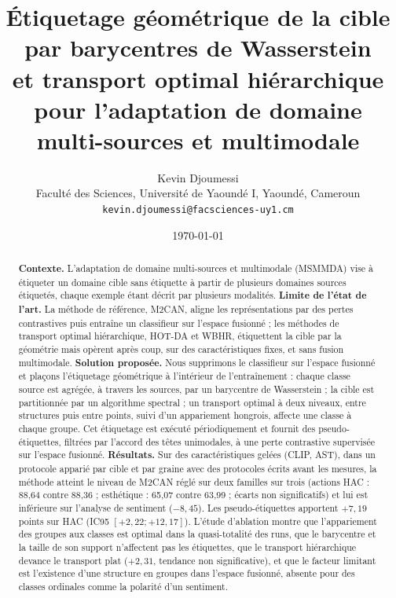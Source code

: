 \documentclass[11pt,a4paper]{article}
\title{Étiquetage géométrique de la cible par barycentres de Wasserstein\\
  et transport optimal hiérarchique pour l'adaptation de domaine\\
  multi-sources et multimodale}
\author{Kevin Djoumessi\\
  Faculté des Sciences, Université de Yaoundé I, Yaoundé, Cameroun\\
  \texttt{kevin.djoumessi@facsciences-uy1.cm}\\[4pt]
  \todo[inline]{Compléter la liste des auteurs et des affiliations.}}
\date{\today}
\theoremstyle{definition}
\theoremstyle{remark}
\begin{document}
\maketitle

\begin{abstract}
\textbf{Contexte.} L'adaptation de domaine multi-sources et multimodale (MSMMDA) vise à étiqueter un domaine cible
sans étiquette à partir de plusieurs domaines sources étiquetés, chaque exemple étant décrit par plusieurs modalités.
\textbf{Limite de l'état de l'art.} La méthode de référence, M2CAN, aligne les représentations par des pertes
contrastives puis entraîne un classifieur sur l'espace fusionné ; les méthodes de transport optimal hiérarchique,
HOT-DA et WBHR, étiquettent la cible par la géométrie mais opèrent après coup, sur des caractéristiques fixes, et sans
fusion multimodale. \textbf{Solution proposée.} Nous supprimons le classifieur sur l'espace fusionné et plaçons
l'étiquetage géométrique à l'intérieur de l'entraînement : chaque classe source est agrégée, à travers les sources, par
un barycentre de Wasserstein ; la cible est partitionnée par un algorithme spectral ; un transport optimal à deux
niveaux, entre structures puis entre points, suivi d'un appariement hongrois, affecte une classe à chaque groupe. Cet
étiquetage est exécuté périodiquement et fournit des pseudo-étiquettes, filtrées par l'accord des têtes unimodales, à
une perte contrastive supervisée sur l'espace fusionné. \textbf{Résultats.} Sur des caractéristiques gelées (CLIP, AST),
dans un protocole apparié par cible et par graine avec des protocoles écrits avant les mesures, la méthode atteint le
niveau de M2CAN réglé sur deux familles sur trois (actions HAC : 88,64 contre 88,36 ; esthétique : 65,07 contre 63,99 ;
écarts non significatifs) et lui est inférieure sur l'analyse de sentiment ($-8{,}45$). Les pseudo-étiquettes apportent
$+7{,}19$ points sur HAC (IC95 $[+2{,}22 ; +12{,}17]$). L'étude d'ablation montre que l'appariement des groupes aux
classes est optimal dans la quasi-totalité des runs, que le barycentre et la taille de son support n'affectent pas les
étiquettes, que le transport hiérarchique devance le transport plat ($+2{,}31$, tendance non significative), et que le
facteur limitant est l'existence d'une structure en groupes dans l'espace fusionné, absente pour des classes ordinales
comme la polarité d'un sentiment.
\end{abstract}

\end{document}
